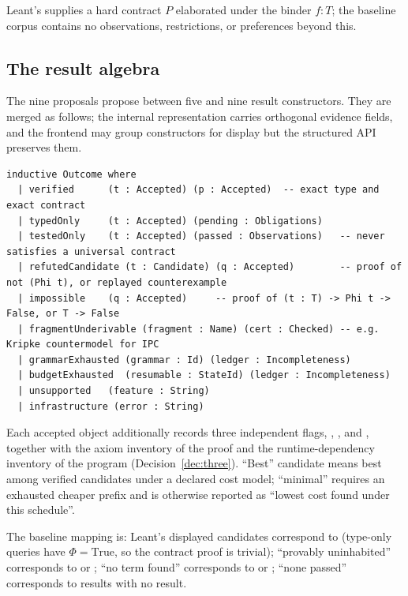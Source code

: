 Leant's  supplies a hard contract $P$ elaborated under the binder $f{:}T$; the baseline corpus contains no observations, restrictions, or preferences beyond this.

\subsection{The result algebra}\label{sec:results}

The nine proposals propose between five and nine result constructors. They are merged as follows; the internal representation carries orthogonal evidence fields, and the frontend may group constructors for display but the structured API preserves them.

\begin{lstlisting}
inductive Outcome where
  | verified      (t : Accepted) (p : Accepted)  -- exact type and exact contract
  | typedOnly     (t : Accepted) (pending : Obligations)
  | testedOnly    (t : Accepted) (passed : Observations)   -- never satisfies a universal contract
  | refutedCandidate (t : Candidate) (q : Accepted)        -- proof of not (Phi t), or replayed counterexample
  | impossible    (q : Accepted)     -- proof of (t : T) -> Phi t -> False, or T -> False
  | fragmentUnderivable (fragment : Name) (cert : Checked) -- e.g. Kripke countermodel for IPC
  | grammarExhausted (grammar : Id) (ledger : Incompleteness)
  | budgetExhausted  (resumable : StateId) (ledger : Incompleteness)
  | unsupported   (feature : String)
  | infrastructure (error : String)
\end{lstlisting}

Each accepted object additionally records three independent flags, , , and , together with the axiom inventory of the proof and the runtime-dependency inventory of the program (Decision~\ref{dec:three}). ``Best'' candidate means best among verified candidates under a declared cost model; ``minimal'' requires an exhausted cheaper prefix and is otherwise reported as ``lowest cost found under this schedule''.

The baseline mapping is: Leant's displayed candidates correspond to  (type-only queries have $\Phi = \mathrm{True}$, so the contract proof is trivial); ``provably uninhabited'' corresponds to  or ; ``no term found'' corresponds to  or ; ``none passed'' corresponds to  results with no  result.

